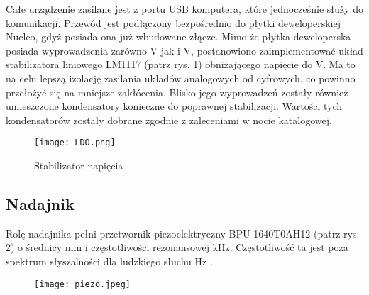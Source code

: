 Całe urządzenie zasilane jest z portu USB komputera, które jednocześnie służy do komunikacji. 
Przewód jest podłączony bezpośrednio do płytki deweloperskiej Nucleo, gdyż posiada ona już wbudowane złącze. 
Mimo że płytka deweloperska posiada wyprowadzenia zarówno \unit[5]{V} jak i \unit[3,3]{V}, 
postanowiono zaimplementować układ stabilizatora liniowego LM1117 (patrz rys. \ref{fig:ldo}) obniżającego napięcie do \unit[3,3]{V}. Ma to na celu lepszą izolację 
zasilania układów analogowych od cyfrowych, co powinno przełożyć się na mniejsze zakłócenia. 
Blisko jego wyprowadzeń zostały również umieszczone kondensatory konieczne do poprawnej stabilizacji. 
Wartości tych kondensatorów zostały dobrane zgodnie z zaleceniami w nocie katalogowej. \cite{ti:lm1117}
\begin{figure}[ht!]
    \centering
    \texttt{[image: LDO.png]}
    \caption{Stabilizator napięcia}
    \label{fig:ldo}
\end{figure}

\subsection{Nadajnik}
Rolę nadajnika pełni przetwornik piezoelektryczny BPU-1640T0AH12 (patrz rys. \ref{fig:piezo}) o średnicy \unit[16]{mm} i częstotliwości rezonansowej \unit[40]{kHz}. 
Częstotliwość ta jest poza spektrum słyszalności dla ludzkiego słuchu \unit[16-20 000]{Hz} \cite{sluch}.
\begin{figure}[ht!]
    \centering
    \texttt{[image: piezo.jpeg]}
    \label{fig:piezo}
\end{figure}


